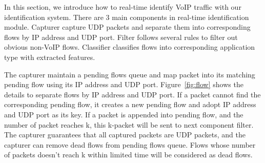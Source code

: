 \documentclass[conference]{IEEEtran}
\begin{document}
In this section, we introduce how to real-time identify VoIP traffic with our identification system. There are 3 main components in real-time identification module. Capturer capture UDP packets and separate them into corresponding flows by IP address and UDP port. Filter follows several rules to filter out obvious non-VoIP flows. Classifier classifies flows into corresponding application type with extracted features.



The capturer maintain a pending flows queue and map packet into its matching pending flow using its IP address and UDP port. Figure~\ref{fig:flow} shows the details to separate flows by IP address and UDP port. If a packet cannot find the corresponding pending flow, it creates a new pending flow and adopt IP address and UDP port as its key. If a packet is appended into pending flow, and the number of packet reaches k, this k-packet will be sent to next component filter. The capturer guarantees that all captured packets are UDP packets, and the capturer can remove dead flows from pending flows queue. Flows whose number of packets doesn't reach k within limited time will be considered as dead flows.
\end{document}
